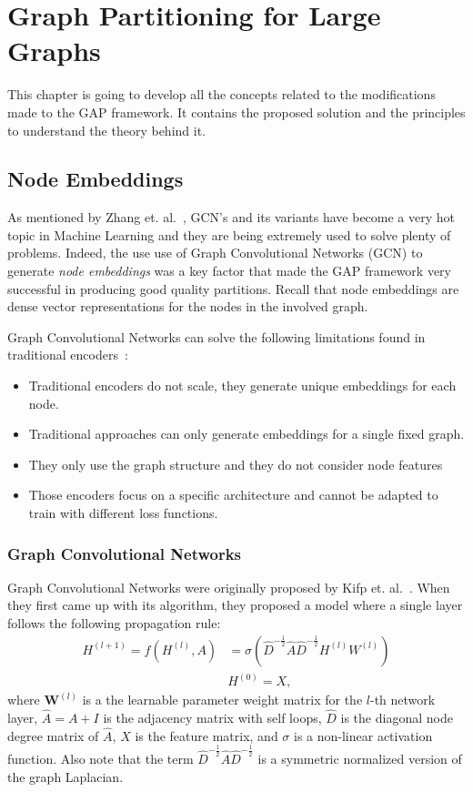 %
%
\let\textcircled=\pgftextcircled
\chapter{Graph Partitioning for Large Graphs}
\label{Chapter3}
This chapter is going to develop all the concepts related to the modifications made to the GAP framework. It contains the proposed solution and the principles to understand the theory behind it.

\section{Node Embeddings}
As mentioned by Zhang et. al.~\cite{gcnreview}, GCN's and its variants have become a very hot topic in Machine Learning and they are being extremely used to solve plenty of problems. Indeed, the use use of Graph Convolutional Networks (GCN) to generate \textit{node embeddings} was a key factor that made the GAP framework very successful in producing good quality partitions. Recall that node embeddings are dense vector representations for the nodes in the involved graph.

Graph Convolutional Networks can solve the following limitations found in traditional encoders~\cite{encoderlimitations}:
\begin{itemize}
    \item Traditional encoders do not scale, they generate unique embeddings for each node.
    \item Traditional approaches can only generate embeddings for a single fixed graph.
    \item They only use the graph structure and they do not consider node features 
    \item Those encoders focus on a specific architecture and cannot be adapted to train with different loss functions.
\end{itemize}

\subsection{Graph Convolutional Networks}
Graph Convolutional Networks were originally proposed by Kifp et. al.~\cite{gcn}. When they first came up with its algorithm, they proposed a model where a single layer follows the following propagation rule:
\begin{align}
    \label{eq:gcn}
    H^{(l+1)} = f(H^{(l)}, A) &= \sigma\left(\hat{D}^{-\frac{1}{2}}\hat{A}\hat{D}^{-\frac{1}{2}}H^{(l)}W^{(l)}\right) \\
    & H^{(0)} = X,
\end{align}
where $\boldsymbol W^{(l)}$ is a the learnable parameter weight matrix for the $l$-th network layer, $\hat{A}=A+I$ is the adjacency matrix with self loops, $\hat{D}$ is the diagonal node degree matrix of $\hat{A}$, $X$ is the feature matrix, and $\sigma$ is a non-linear activation function. Also note that the term $\hat{D}^{-\frac{1}{2}}\hat{A}\hat{D}^{-\frac{1}{2}}$ is a symmetric normalized version of the graph Laplacian.

